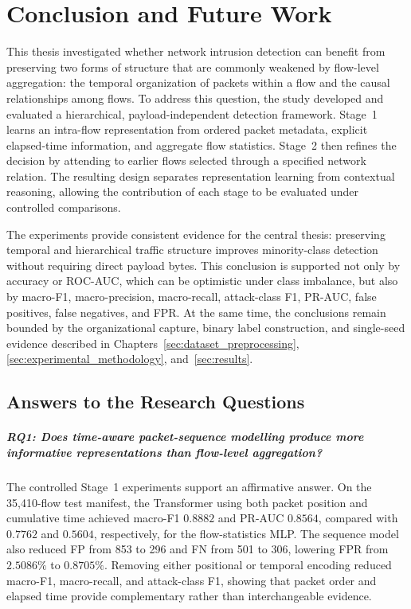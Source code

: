 %

\chapter{Conclusion and Future Work}
\label{sec:conclusion_future_work}

This thesis investigated whether network intrusion detection can benefit from
preserving two forms of structure that are commonly weakened by flow-level
aggregation: the temporal organization of packets within a flow and the causal
relationships among flows. To address this question, the study developed and
evaluated a hierarchical, payload-independent detection framework. Stage~1
learns an intra-flow representation from ordered packet metadata, explicit
elapsed-time information, and aggregate flow statistics. Stage~2 then refines
the decision by attending to earlier flows selected through a specified network
relation. The resulting design separates representation learning from
contextual reasoning, allowing the contribution of each stage to be evaluated
under controlled comparisons.

The experiments provide consistent evidence for the central thesis: preserving
temporal and hierarchical traffic structure improves minority-class detection
without requiring direct payload bytes. This conclusion is supported not only
by accuracy or ROC-AUC, which can be optimistic under class imbalance, but also
by macro-F1, macro-precision, macro-recall, attack-class F1, PR-AUC, false
positives, false negatives, and FPR. At the same time, the conclusions remain
bounded by the organizational capture, binary label construction, and
single-seed evidence described in Chapters~\ref{sec:dataset_preprocessing},
\ref{sec:experimental_methodology}, and~\ref{sec:results}.

\section{Answers to the Research Questions}
\label{subsec:conclusion_rq_answers}

\paragraph{RQ1: Does time-aware packet-sequence modelling produce more
informative representations than flow-level aggregation?}
The controlled Stage~1 experiments support an affirmative answer. On the
35,410-flow test manifest, the Transformer using both packet position and
cumulative time achieved macro-F1 $0.8882$ and PR-AUC $0.8564$, compared with
$0.7762$ and $0.5604$, respectively, for the flow-statistics MLP. The sequence
model also reduced FP from 853 to 296 and FN from 501 to 306, lowering FPR from
$2.5086\%$ to $0.8705\%$. Removing either positional or temporal encoding
reduced macro-F1, macro-recall, and attack-class F1, showing that packet order
and elapsed time provide complementary rather than interchangeable evidence.

